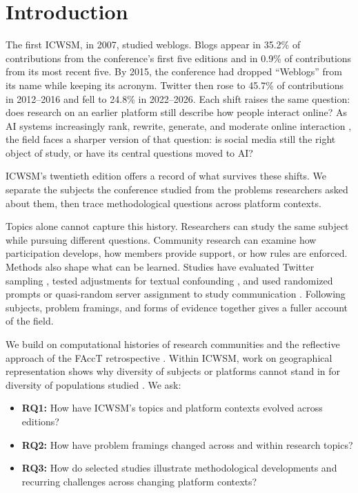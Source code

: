 \section{Introduction}
The first ICWSM, in 2007, studied weblogs. Blogs appear in 35.2\% of contributions from the conference's first five editions and in 0.9\% of contributions from its most recent five. By 2015, the conference had dropped ``Weblogs'' from its name while keeping its acronym. Twitter then rose to 45.7\% of contributions in 2012--2016 and fell to 24.8\% in 2022--2026. Each shift raises the same question: does research on an earlier platform still describe how people interact online? As AI systems increasingly rank, rewrite, generate, and moderate online interaction \citep{hancock2020,hohenstein2023}, the field faces a sharper version of that question: is social media still the right object of study, or have its central questions moved to AI?

ICWSM's twentieth edition offers a record of what survives these shifts. We separate the subjects the conference studied from the problems researchers asked about them, then trace methodological questions across platform contexts.

Topics alone cannot capture this history. Researchers can study the same subject while pursuing different questions. Community research can examine how participation develops, how members provide support, or how rules are enforced. Methods also shape what can be learned. Studies have evaluated Twitter sampling \citep{p14401}, tested adjustments for textual confounding \citep{p19362}, and used randomized prompts or quasi-random server assignment to study communication \citep{p19308,p31365}. Following subjects, problem framings, and forms of evidence together gives a fuller account of the field.

We build on computational histories of research communities \citep{hall2008,liu2014,wallace2017} and the reflective approach of the FAccT retrospective \citep{facct2022}. Within ICWSM, work on geographical representation shows why diversity of subjects or platforms cannot stand in for diversity of populations studied \citep{weird2024}. We ask:
\begin{itemize}
\item \textbf{RQ1:} How have ICWSM's topics and platform contexts evolved across editions?
\item \textbf{RQ2:} How have problem framings changed across and within research topics?
\item \textbf{RQ3:} How do selected studies illustrate methodological developments and recurring challenges across changing platform contexts?
\end{itemize}

